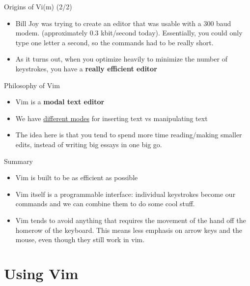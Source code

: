 \documentclass[12pt]{beamer}
\begin{document}
\begin{frame}{Origins of Vi(m) (2/2)}
    \begin{itemize}
        \item Bill Joy was trying to create an editor that was usable with a 300 baud modem. (approximately 0.3 kbit/second today). Essentially, you could only type one letter a second, so the commands had to be really short.
        \item As it turns out, when you optimize heavily to minimize the number of keystrokes, you have a
              \textbf{really efficient editor}
    \end{itemize}{}
\end{frame}{}

\begin{frame}{Philosophy of Vim}
    \begin{itemize}
        \item Vim is a \textbf{modal text editor}
        \item We have \underline{different modes} for inserting text vs manipulating text
        \item The idea here is that you tend to spend more time reading/making smaller edits, instead of
              writing big essays in one big go.
    \end{itemize}{}
\end{frame}{}

\begin{frame}{Summary}
    \begin{itemize}
        \item Vim is built to be as efficient as possible
        \item Vim itself is a programmable interface: individual keystrokes become our commands and we can combine them to do some cool stuff.
        \item Vim tends to avoid anything that requires the movement of the hand off the homerow of the keyboard. This means less emphasis on arrow keys and the mouse, even though they still work in vim.
    \end{itemize}
\end{frame}

\section{Using Vim}
\subsection{}
\end{document}
